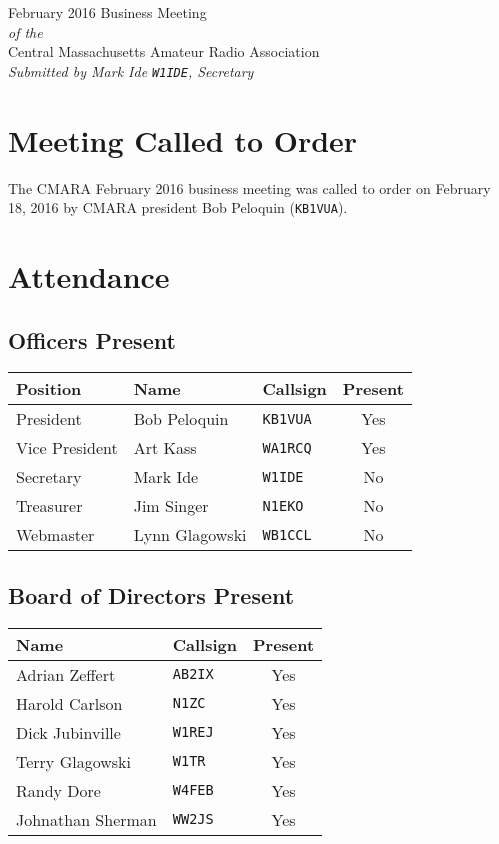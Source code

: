\documentclass[10pt,letterpaper]{article}
\begin{document}
\begin{center}
{\huge February 2016 Business Meeting}\\
\emph{of the}\\
{\Large Central Massachusetts Amateur Radio Association}\\
\emph{Submitted by Mark Ide \texttt{W1IDE}, Secretary}
\end{center}

\section{Meeting Called to Order}
The CMARA February 2016 business meeting was called to order on February 18, 2016 by CMARA president Bob Peloquin (\texttt{KB1VUA}).

\section{Attendance}

\subsection{Officers Present}

\begin{tabular}{|l|l|l|c|}
  \hline
  \textbf{Position} & \textbf{Name}  & \textbf{Callsign} & \textbf{Present} \\ \hline
  President         & Bob Peloquin   & \texttt{KB1VUA}   & Yes              \\
  Vice President    & Art Kass       & \texttt{WA1RCQ}   & Yes              \\
  Secretary         & Mark Ide       & \texttt{W1IDE}    & No               \\
  Treasurer         & Jim Singer     & \texttt{N1EKO}    & No               \\
  Webmaster         & Lynn Glagowski & \texttt{WB1CCL}   & No               \\
  \hline
\end{tabular}

\subsection{Board of Directors Present}

\begin{tabular}{|l|l|c|}
  \hline
  \textbf{Name}     & \textbf{Callsign} & \textbf{Present} \\ \hline
  Adrian Zeffert    & \texttt{AB2IX}    & Yes              \\
  Harold Carlson    & \texttt{N1ZC}     & Yes              \\
  Dick Jubinville   & \texttt{W1REJ}    & Yes              \\
  Terry Glagowski   & \texttt{W1TR}     & Yes              \\
  Randy Dore        & \texttt{W4FEB}    & Yes              \\
  Johnathan Sherman & \texttt{WW2JS}    & Yes              \\
  \hline
\end{tabular}
\end{document}
